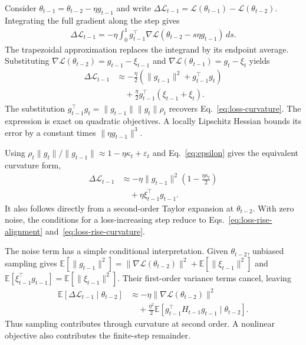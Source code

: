 Consider $\theta_{t-1}=\theta_{t-2}-\eta g_{t-1}$ and write
$\Delta\mathcal L_{t-1}=\mathcal L(\theta_{t-1})-\mathcal L(\theta_{t-2})$.
Integrating the full gradient along the step gives
\begin{equation}
\begin{aligned}
\Delta\mathcal L_{t-1}
=-\eta\int_0^1 g_{t-1}^\top
\nabla\mathcal{L}(\theta_{t-2}-s\eta g_{t-1})\,ds.
\end{aligned}
\label{eq:appendix-loss-integral}
\end{equation}
The trapezoidal approximation replaces the integrand by its endpoint
average. Substituting
$\nabla\mathcal L(\theta_{t-2})=g_{t-1}-\xi_{t-1}$ and
$\nabla\mathcal L(\theta_{t-1})=g_t-\xi_t$ yields
\begin{equation}
\begin{aligned}
\Delta\mathcal L_{t-1}
&\approx-\frac{\eta}{2}
\left(\|g_{t-1}\|^2+g_{t-1}^\top g_t\right)\\
&\quad+\frac{\eta}{2}
g_{t-1}^\top(\xi_{t-1}+\xi_t).
\end{aligned}
\label{eq:appendix-loss-gradient}
\end{equation}
The substitution $g_{t-1}^\top g_t=\|g_{t-1}\|\|g_t\|\rho_t$
recovers Eq.~\eqref{eq:loss-curvature}. The expression is exact on
quadratic objectives. A locally Lipschitz Hessian bounds its error
by a constant times $\|\eta g_{t-1}\|^3$.

Using $\rho_t\|g_t\|/\|g_{t-1}\|
\approx1-\eta\kappa_t+\varepsilon_t$ and
Eq.~\eqref{eq:epsilon} gives the equivalent curvature form,
\begin{equation}
\begin{aligned}
\Delta\mathcal L_{t-1}
&\approx-\eta\|g_{t-1}\|^2
\left(1-\frac{\eta\kappa_t}{2}\right)
\\&\quad+\eta\xi_{t-1}^\top g_{t-1}.
\end{aligned}
\label{eq:appendix-loss-curvature}
\end{equation}
It also follows directly from a second-order Taylor expansion at
$\theta_{t-2}$. With zero noise, the conditions for a loss-increasing
step reduce to Eqs.~\eqref{eq:loss-rise-alignment}
and~\eqref{eq:loss-rise-curvature}.

The noise term has a simple conditional interpretation. Given
$\theta_{t-2}$, unbiased sampling gives
$\mathbb E[\|g_{t-1}\|^2]=\|\nabla\mathcal L(\theta_{t-2})\|^2
+\mathbb E[\|\xi_{t-1}\|^2]$ and
$\mathbb E[\xi_{t-1}^\top g_{t-1}]=\mathbb E[\|\xi_{t-1}\|^2]$.
Their first-order variance terms cancel, leaving
\begin{equation}
\begin{aligned}
\mathbb E[\Delta\mathcal L_{t-1}\mid\theta_{t-2}]
&\approx-\eta\|\nabla\mathcal L(\theta_{t-2})\|^2\\
&\quad+\frac{\eta^2}{2}\mathbb E[
g_{t-1}^\top H_{t-1}g_{t-1}\mid\theta_{t-2}].
\end{aligned}
\label{eq:expected-loss-change}
\end{equation}
Thus sampling contributes through curvature at second order. A nonlinear
objective also contributes the finite-step remainder.

